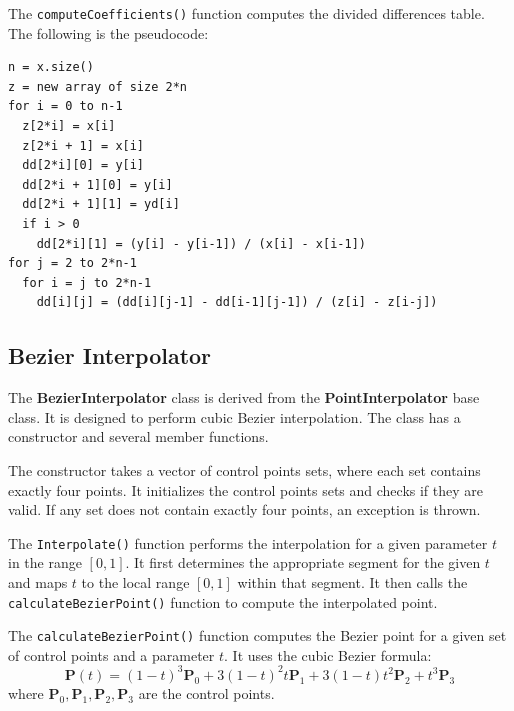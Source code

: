 \documentclass[a4paper]{article}
\begin{document}
The \texttt{computeCoefficients()} function computes the divided differences table. The following is the pseudocode:
\begin{lstlisting}
n = x.size()
z = new array of size 2*n
for i = 0 to n-1
  z[2*i] = x[i]
  z[2*i + 1] = x[i]
  dd[2*i][0] = y[i]
  dd[2*i + 1][0] = y[i]
  dd[2*i + 1][1] = yd[i]
  if i > 0
    dd[2*i][1] = (y[i] - y[i-1]) / (x[i] - x[i-1])
for j = 2 to 2*n-1
  for i = j to 2*n-1
    dd[i][j] = (dd[i][j-1] - dd[i-1][j-1]) / (z[i] - z[i-j])
\end{lstlisting}

\subsection{Bezier Interpolator}
The \textbf{BezierInterpolator} class is derived from the \textbf{PointInterpolator} base class. It is designed to perform cubic Bezier interpolation. The class has a constructor and several member functions.

The constructor takes a vector of control points sets, where each set contains exactly four points. It initializes the control points sets and checks if they are valid. If any set does not contain exactly four points, an exception is thrown.

The \texttt{Interpolate()} function performs the interpolation for a given parameter \( t \) in the range \([0, 1]\). It first determines the appropriate segment for the given \( t \) and maps \( t \) to the local range \([0, 1]\) within that segment. It then calls the \texttt{calculateBezierPoint()} function to compute the interpolated point.

The \texttt{calculateBezierPoint()} function computes the Bezier point for a given set of control points and a parameter \( t \). It uses the cubic Bezier formula:
\[
\mathbf{P}(t) = (1-t)^3 \mathbf{P}_0 + 3(1-t)^2 t \mathbf{P}_1 + 3(1-t) t^2 \mathbf{P}_2 + t^3 \mathbf{P}_3
\]
where \(\mathbf{P}_0, \mathbf{P}_1, \mathbf{P}_2, \mathbf{P}_3\) are the control points.
\end{document}
